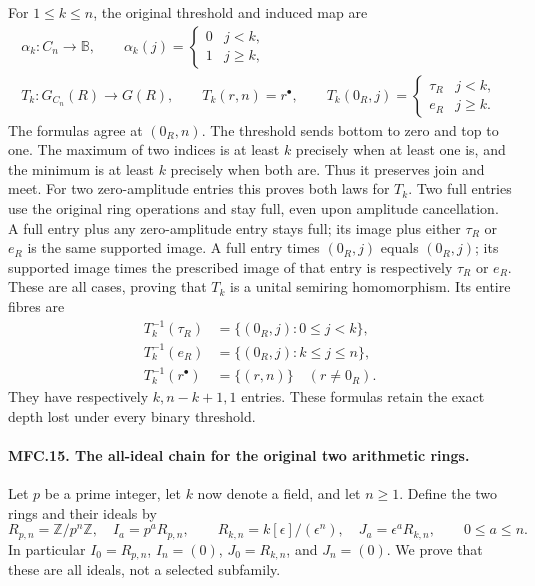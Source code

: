 For \(1\le k\le n\), the original threshold and induced map are
\[
 \begin{gathered}
 \alpha_k:C_n\to\mathbb B,\qquad
 \alpha_k(j)=
 \begin{cases}0&j<k,\\1&j\ge k,\end{cases}\\
 T_k:G_{C_n}(R)\to G(R),\qquad T_k(r,n)=r^\bullet,\qquad
 T_k(0_R,j)=
 \begin{cases}\tau_R&j<k,\\e_R&j\ge k.\end{cases}
 \end{gathered}                                          \tag{MFC.36}
\]
The formulas agree at \((0_R,n)\).
The threshold sends bottom to zero and top to one.
The maximum of two indices is at least \(k\) precisely
when at least one is, and the minimum is at least \(k\)
precisely when both are. Thus it preserves join and meet.
For two zero-amplitude entries this proves both laws
for \(T_k\). Two full entries use the original ring
operations and stay full, even upon amplitude cancellation.
A full entry plus any zero-amplitude entry stays full;
its image plus either \(\tau_R\) or \(e_R\) is the same
supported image. A full entry times \((0_R,j)\) equals
\((0_R,j)\); its supported image times the prescribed
image of that entry is respectively \(\tau_R\) or \(e_R\).
These are all cases, proving that \(T_k\) is a unital
semiring homomorphism.
Its entire fibres are
\[
 \begin{aligned}
 T_k^{-1}(\tau_R)&=\{(0_R,j):0\le j<k\},\\
 T_k^{-1}(e_R)&=\{(0_R,j):k\le j\le n\},\\
 T_k^{-1}(r^\bullet)&=\{(r,n)\}\quad(r\ne0_R).
 \end{aligned}                                           \tag{MFC.37}
\]
They have respectively \(k,n-k+1,1\) entries. These formulas
retain the exact depth lost under every binary threshold.

\paragraph{MFC.15. The all-ideal chain for the original two arithmetic rings.}
Let \(p\) be a prime integer, let \(k\) now denote a field,
and let \(n\ge1\). Define the two rings and their ideals by
\[
 R_{p,n}=\mathbb Z/p^n\mathbb Z,\quad
 I_a=p^aR_{p,n},\qquad
 R_{k,n}=k[\epsilon]/(\epsilon^n),\quad
 J_a=\epsilon^aR_{k,n},\qquad 0\le a\le n.                \tag{MFC.38}
\]
In particular \(I_0=R_{p,n}\), \(I_n=(0)\),
\(J_0=R_{k,n}\), and \(J_n=(0)\).
We prove that these are all ideals, not a selected subfamily.

